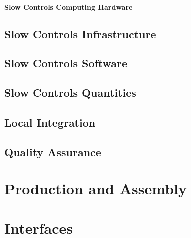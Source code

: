 \paragraph{Slow Controls Computing Hardware}


\subsection{Slow Controls Infrastructure}
\label{sec:fdsp-slow-cryo-slow-infra}

\subsection{Slow Controls Software}
\label{sec:fdsp-slow-cryo-sw}

\subsection{Slow Controls Quantities}
\label{sec:fdsp-slow-cryo-quant}

\subsection{Local Integration}
\label{sec:fdsp-slow-cryo-slow-loc-integ}

\subsection{Quality Assurance}
\label{sec:fdsp-slow-cryo-slow-qa}



\section{Production and Assembly}
\label{sec:fdsp-slow-cryo-prod-assy}




\section{Interfaces}
\label{sec:fdsp-slow-cryo-intfc}

